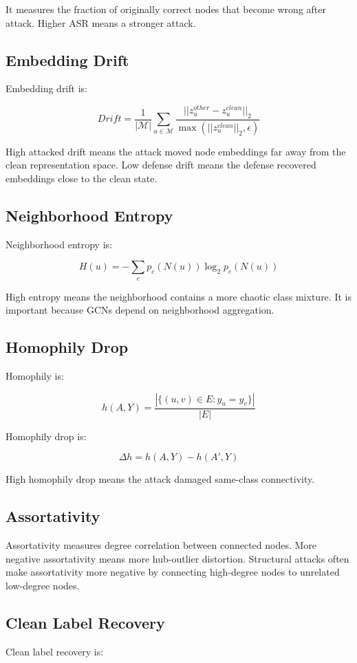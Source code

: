 \documentclass[12pt,a4paper]{article}
\begin{document}
It measures the fraction of originally correct nodes that become wrong after attack. Higher ASR means a stronger attack.

\subsection{Embedding Drift}
Embedding drift is:

$$
Drift=\frac{1}{|\mathcal{M}|}\sum_{u\in\mathcal{M}}\frac{||z_u^{other}-z_u^{clean}||_2}{\max(||z_u^{clean}||_2,\epsilon)}
$$

High attacked drift means the attack moved node embeddings far away from the clean representation space. Low defense drift means the defense recovered embeddings close to the clean state.

\subsection{Neighborhood Entropy}
Neighborhood entropy is:

$$
H(u)=-\sum_c p_c(N(u))\log_2p_c(N(u))
$$

High entropy means the neighborhood contains a more chaotic class mixture. It is important because GCNs depend on neighborhood aggregation.

\subsection{Homophily Drop}
Homophily is:

$$
h(A,Y)=\frac{|\{(u,v)\in E:y_u=y_v\}|}{|E|}
$$

Homophily drop is:

$$
\Delta h=h(A,Y)-h(A',Y)
$$

High homophily drop means the attack damaged same-class connectivity.

\subsection{Assortativity}
Assortativity measures degree correlation between connected nodes. More negative assortativity means more hub-outlier distortion. Structural attacks often make assortativity more negative by connecting high-degree nodes to unrelated low-degree nodes.

\subsection{Clean Label Recovery}
Clean label recovery is:
\end{document}
